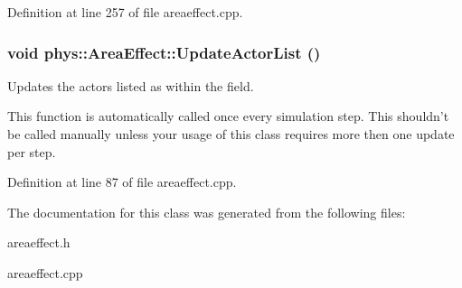 Definition at line 257 of file areaeffect.cpp.

\hypertarget{classphys_1_1AreaEffect_a0a0e6dfc6353d19b19e7bea037172072}{
\subsubsection[{UpdateActorList}]{\setlength{\rightskip}{0pt plus 5cm}void phys::AreaEffect::UpdateActorList ()}}
\label{d4/d55/classphys_1_1AreaEffect_a0a0e6dfc6353d19b19e7bea037172072}


Updates the actors listed as within the field. 

This function is automatically called once every simulation step. This shouldn't be called manually unless your usage of this class requires more then one update per step. 

Definition at line 87 of file areaeffect.cpp.



The documentation for this class was generated from the following files:\begin{DoxyCompactItemize}
\item 
areaeffect.h\item 
areaeffect.cpp\end{DoxyCompactItemize}
